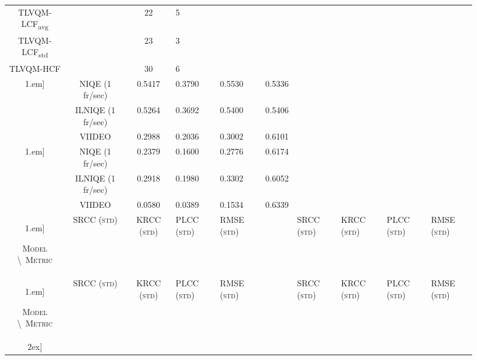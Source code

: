 \documentclass[journal]{IEEEtran}
\begin{document}
\begin{figure}[!t]
\begin{tabular}{ccc}
TLVQM-LCF\textsubscript{avg}  &        & 22   &  5 \\
TLVQM-LCF\textsubscript{std}  &        & 23   &  3 \\
TLVQM-HCF  &        &  30 & 6 \\ \hline\-1.em]
 & NIQE (1 fr/sec)    & 0.5417 & 0.3790  & 0.5530  & 0.5336  \\
& ILNIQE (1 fr/sec)  & 0.5264  & 0.3692  & 0.5400  & 0.5406  \\
& VIIDEO  & 0.2988 & 0.2036  & 0.3002 & 0.6101  \\
\hline\-1.em]
& NIQE (1 fr/sec) & 0.2379 & 0.1600 & 0.2776 & 0.6174  \\
& ILNIQE (1 fr/sec) & 0.2918 & 0.1980 & 0.3302 & 0.6052  \\
& VIIDEO  & 0.0580 & 0.0389  & 0.1534  & 0.6339 \\
\hline\-1.em]

\textsc{Model} \textbackslash\ \textsc{Metric} & \textsc{SRCC (std)}    & \textsc{KRCC (std)}    & \textsc{PLCC (std)}     & \textsc{RMSE (std)} & & \textsc{SRCC (std)}    & \textsc{KRCC (std)}    & \textsc{PLCC (std)}     & \textsc{RMSE (std)}   \\ 
\hline\-1.em]

\textsc{Model} \textbackslash\ \textsc{Metric} & \textsc{SRCC (std)}    & \textsc{KRCC (std)}    & \textsc{PLCC (std)}     & \textsc{RMSE (std)} & & \textsc{SRCC (std)}    & \textsc{KRCC (std)}    & \textsc{PLCC (std)}     & \textsc{RMSE (std)}   \\
\hline\-2ex]

\hspace{\hswidth}
\hspace{\hswidth}
\hspace{\hswidth}
\hspace{\hswidth}
 \\ [-2ex]


\end{tabular}
\end{figure}
\end{document}

